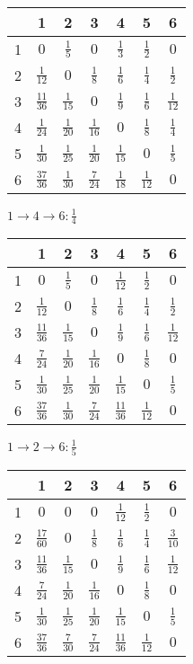 \documentclass[russian]{article}
\begin{document}
\begin{tabular}{|c|c|c|c|c|c|c|}\hline
& 1& 2& 3& 4& 5& 6\\\hline
1& $0$& $\frac{1}{5}$& $0$& $\frac{1}{3}$& $\frac{1}{2}$& $0$\\\hline
2& $\frac{1}{12}$& $0$& $\frac{1}{8}$& $\frac{1}{6}$& $\frac{1}{4}$& $\frac{1}{2}$\\\hline
3& $\frac{11}{36}$& $\frac{1}{15}$& $0$& $\frac{1}{9}$& $\frac{1}{6}$& $\frac{1}{12}$\\\hline
4& $\frac{1}{24}$& $\frac{1}{20}$& $\frac{1}{16}$& $0$& $\frac{1}{8}$& $\frac{1}{4}$\\\hline
5& $\frac{1}{30}$& $\frac{1}{25}$& $\frac{1}{20}$& $\frac{1}{15}$& $0$& $\frac{1}{5}$\\\hline
6& $\frac{37}{36}$& $\frac{1}{30}$& $\frac{7}{24}$& $\frac{1}{18}$& $\frac{1}{12}$& $0$\\\hline
\end{tabular}

$ 1 \to 4 \to 6 : \frac{1}{4}$

\begin{tabular}{|c|c|c|c|c|c|c|}\hline
& 1& 2& 3& 4& 5& 6\\\hline
1& $0$& $\frac{1}{5}$& $0$& $\frac{1}{12}$& $\frac{1}{2}$& $0$\\\hline
2& $\frac{1}{12}$& $0$& $\frac{1}{8}$& $\frac{1}{6}$& $\frac{1}{4}$& $\frac{1}{2}$\\\hline
3& $\frac{11}{36}$& $\frac{1}{15}$& $0$& $\frac{1}{9}$& $\frac{1}{6}$& $\frac{1}{12}$\\\hline
4& $\frac{7}{24}$& $\frac{1}{20}$& $\frac{1}{16}$& $0$& $\frac{1}{8}$& $0$\\\hline
5& $\frac{1}{30}$& $\frac{1}{25}$& $\frac{1}{20}$& $\frac{1}{15}$& $0$& $\frac{1}{5}$\\\hline
6& $\frac{37}{36}$& $\frac{1}{30}$& $\frac{7}{24}$& $\frac{11}{36}$& $\frac{1}{12}$& $0$\\\hline
\end{tabular}

$ 1 \to 2 \to 6 : \frac{1}{5}$

\begin{tabular}{|c|c|c|c|c|c|c|}\hline
& 1& 2& 3& 4& 5& 6\\\hline
1& $0$& $0$& $0$& $\frac{1}{12}$& $\frac{1}{2}$& $0$\\\hline
2& $\frac{17}{60}$& $0$& $\frac{1}{8}$& $\frac{1}{6}$& $\frac{1}{4}$& $\frac{3}{10}$\\\hline
3& $\frac{11}{36}$& $\frac{1}{15}$& $0$& $\frac{1}{9}$& $\frac{1}{6}$& $\frac{1}{12}$\\\hline
4& $\frac{7}{24}$& $\frac{1}{20}$& $\frac{1}{16}$& $0$& $\frac{1}{8}$& $0$\\\hline
5& $\frac{1}{30}$& $\frac{1}{25}$& $\frac{1}{20}$& $\frac{1}{15}$& $0$& $\frac{1}{5}$\\\hline
6& $\frac{37}{36}$& $\frac{7}{30}$& $\frac{7}{24}$& $\frac{11}{36}$& $\frac{1}{12}$& $0$\\\hline
\end{tabular}
\end{document}
